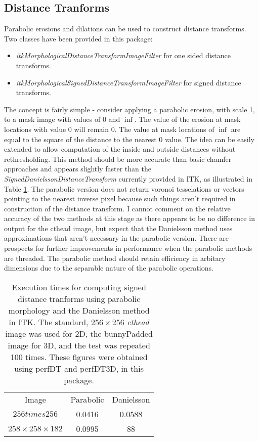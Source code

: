 \documentclass{InsightArticle}
\begin{document}
\subsection{Distance Tranforms}
Parabolic erosions and dilations can be used to construct distance
transforms. Two classes have been provided in this package:
\begin{itemize}
\item {\em itkMorphologicalDistanceTransformImageFilter} for one sided distance transforms.
\item {\em itkMorphologicalSignedDistanceTransformImageFilter} for signed distance transforms.
\end{itemize}
The concept is fairly simple - consider applying a parabolic erosion,
with scale 1, to a mask image with values of $0$ and $\inf$. The value
of the erosion at mask locations with value 0 will remain 0. The value
at mask locations of $\inf$ are equal to the square of the distance to
the nearest 0 value. The idea can be easily extended to allow
computation of the inside and outside distances without
rethresholding. This method should be more accurate than basic chamfer
approaches and appears slightly faster than the {\em
  SignedDanielssonDistanceTransform} currently provided in ITK, as
illustrated in Table \ref{tbl:perf}. The parabolic version does not
return voronoi tesselations or vectors pointing to the nearest inverse
pixel because such things aren't required in construction of the
distance transform. I cannot comment on the relative accuracy of the
two methods at this stage as there appears to be no difference in
output for the cthead image, but expect that the Danielsson method
uses approximations that aren't necessary in the parabolic
version. There are prospects for further improvements in performance
when the parabolic methods are threaded. The parabolic method should
retain efficiency in arbitary dimensions due to the separable nature
of the parabolic operations.
\begin{table}[phtb]
\centering
\begin{tabular}{ccc}
\hline
Image & Parabolic &  Danielsson \\
$256 times 256$ & 0.0416  & 0.0588 \\
$258 \times 258 \times 182$ & 0.0995 & 88\\
\hline
\end{tabular}
\caption{Execution times for computing signed distance tranforms using parabolic morphology and the Danielsson method in ITK. The standard, $256 \times 256$ {\em cthead} image was used for 2D, the bunnyPadded image for 3D, and the test was repeated 100 times. These figures were obtained using perfDT and perfDT3D, in this package.\label{tbl:perf}}
\end{table}
\end{document}
